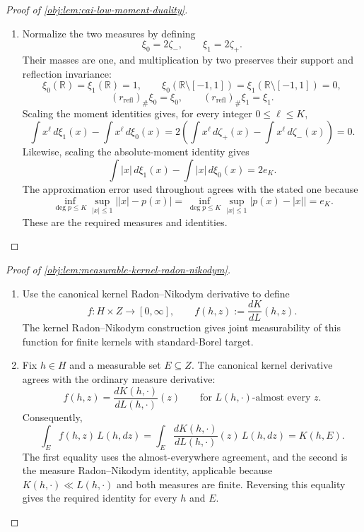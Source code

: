 \begin{proof}[Proof of \cref{obj:lem:cai-low-moment-duality}]
\begin{enumerate}
\item Normalize the two measures by defining
\[
\xi_0=2\zeta_-,\qquad \xi_1=2\zeta_+.
\]
Their masses are one, and multiplication by two preserves their support and reflection invariance:
\[
\xi_0(\mathbb R)=\xi_1(\mathbb R)=1,\qquad
\xi_0(\mathbb R\setminus[-1,1])
=\xi_1(\mathbb R\setminus[-1,1])=0,
\]
\[
(r_{\mathrm{refl}})_\#\xi_0=\xi_0,\qquad
(r_{\mathrm{refl}})_\#\xi_1=\xi_1.
\]
Scaling the moment identities gives, for every integer \(0\le\ell\le K\),
\[
\int x^\ell\,d\xi_1(x)-\int x^\ell\,d\xi_0(x)
=2\left(\int x^\ell\,d\zeta_+(x)-\int x^\ell\,d\zeta_-(x)\right)
=0.
\]
Likewise, scaling the absolute-moment identity gives
\[
\int |x|\,d\xi_1(x)-\int |x|\,d\xi_0(x)=2e_K.
\]
The approximation error used throughout agrees with the stated one because
\[
\inf_{\deg p\le K}\sup_{|x|\le1}\bigl||x|-p(x)\bigr|
=
\inf_{\deg p\le K}\sup_{|x|\le1}\bigl|p(x)-|x|\bigr|
=e_K.
\]
These are the required measures and identities.
\end{enumerate}
\end{proof}

\begin{proof}[Proof of \cref{obj:lem:measurable-kernel-radon-nikodym}]
\begin{enumerate}
\item Use the canonical kernel Radon--Nikodym derivative to define
\[
f:H\times Z\longrightarrow[0,\infty],
\qquad
f(h,z):=\frac{dK}{dL}(h,z).
\]
The kernel Radon--Nikodym construction gives joint measurability of this function for finite kernels with standard-Borel target. %

\item Fix \(h\in H\) and a measurable set \(E\subseteq Z\). The canonical kernel derivative agrees with the ordinary measure derivative:
\[
f(h,z)
=
\frac{dK(h,\cdot)}{dL(h,\cdot)}(z)
\qquad\text{for \(L(h,\cdot)\)-almost every \(z\)}.
\]
Consequently,
\[
\int_E f(h,z)\,L(h,dz)
=
\int_E
\frac{dK(h,\cdot)}{dL(h,\cdot)}(z)\,L(h,dz)
=
K(h,E).
\]
The first equality uses the almost-everywhere agreement, and the second is the measure Radon--Nikodym identity, applicable because \(K(h,\cdot)\ll L(h,\cdot)\) and both measures are finite. Reversing this equality gives the required identity for every \(h\) and \(E\). %
\end{enumerate}
\end{proof}
